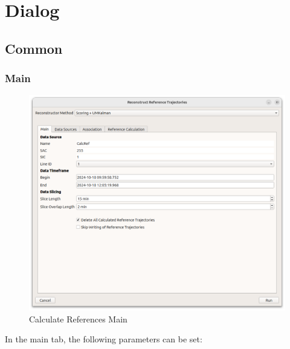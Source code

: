 \section{Dialog}

\subsection{Common}

\subsubsection{Main}

\begin{figure}[H]
    \center
      \includegraphics[width=16cm]{figures/dialog_main.png}
    \caption{Calculate References Main}
\end{figure}

In the main tab, the following parameters can be set:

